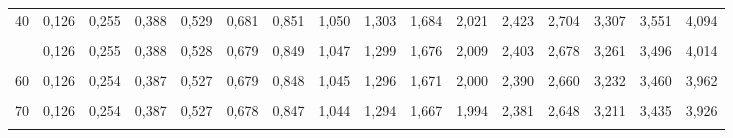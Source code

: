 \documentclass[
  ngerman,
]{article}
\begin{document}
\begin{table}[!h]
{\begin{tabular}{>{}r|rrrrrrrrrrrrrrr}
40 & 0,126 & 0,255 & 0,388 & 0,529 & 0,681 & 0,851 & 1,050 & 1,303 & 1,684 & 2,021 & 2,423 & 2,704 & 3,307 & 3,551 & 4,094\\
\cellcolor{gray!6}{45} & \cellcolor{gray!6}{0,126} & \cellcolor{gray!6}{0,255} & \cellcolor{gray!6}{0,388} & \cellcolor{gray!6}{0,528} & \cellcolor{gray!6}{0,680} & \cellcolor{gray!6}{0,850} & \cellcolor{gray!6}{1,049} & \cellcolor{gray!6}{1,301} & \cellcolor{gray!6}{1,679} & \cellcolor{gray!6}{2,014} & \cellcolor{gray!6}{2,412} & \cellcolor{gray!6}{2,690} & \cellcolor{gray!6}{3,281} & \cellcolor{gray!6}{3,520} & \cellcolor{gray!6}{4,049}\\
\addlinespace
50 & 0,126 & 0,255 & 0,388 & 0,528 & 0,679 & 0,849 & 1,047 & 1,299 & 1,676 & 2,009 & 2,403 & 2,678 & 3,261 & 3,496 & 4,014\\
\cellcolor{gray!6}{55} & \cellcolor{gray!6}{0,126} & \cellcolor{gray!6}{0,255} & \cellcolor{gray!6}{0,387} & \cellcolor{gray!6}{0,527} & \cellcolor{gray!6}{0,679} & \cellcolor{gray!6}{0,848} & \cellcolor{gray!6}{1,046} & \cellcolor{gray!6}{1,297} & \cellcolor{gray!6}{1,673} & \cellcolor{gray!6}{2,004} & \cellcolor{gray!6}{2,396} & \cellcolor{gray!6}{2,668} & \cellcolor{gray!6}{3,245} & \cellcolor{gray!6}{3,476} & \cellcolor{gray!6}{3,986}\\
60 & 0,126 & 0,254 & 0,387 & 0,527 & 0,679 & 0,848 & 1,045 & 1,296 & 1,671 & 2,000 & 2,390 & 2,660 & 3,232 & 3,460 & 3,962\\
\cellcolor{gray!6}{65} & \cellcolor{gray!6}{0,126} & \cellcolor{gray!6}{0,254} & \cellcolor{gray!6}{0,387} & \cellcolor{gray!6}{0,527} & \cellcolor{gray!6}{0,678} & \cellcolor{gray!6}{0,847} & \cellcolor{gray!6}{1,045} & \cellcolor{gray!6}{1,295} & \cellcolor{gray!6}{1,669} & \cellcolor{gray!6}{1,997} & \cellcolor{gray!6}{2,385} & \cellcolor{gray!6}{2,654} & \cellcolor{gray!6}{3,220} & \cellcolor{gray!6}{3,447} & \cellcolor{gray!6}{3,942}\\
70 & 0,126 & 0,254 & 0,387 & 0,527 & 0,678 & 0,847 & 1,044 & 1,294 & 1,667 & 1,994 & 2,381 & 2,648 & 3,211 & 3,435 & 3,926\\
\addlinespace
\cellcolor{gray!6}{75} & \cellcolor{gray!6}{0,126} & \cellcolor{gray!6}{0,254} & \cellcolor{gray!6}{0,387} & \cellcolor{gray!6}{0,527} & \cellcolor{gray!6}{0,678} & \cellcolor{gray!6}{0,846} & \cellcolor{gray!6}{1,044} & \cellcolor{gray!6}{1,293} & \cellcolor{gray!6}{1,665} & \cellcolor{gray!6}{1,992} & \cellcolor{gray!6}{2,377} & \cellcolor{gray!6}{2,643} & \cellcolor{gray!6}{3,202} & \cellcolor{gray!6}{3,425} & \cellcolor{gray!6}{3,911}\\

\end{tabular}}
\end{table}
\end{document}
